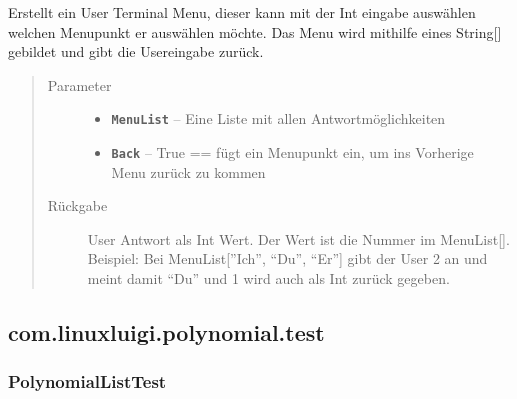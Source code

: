 \documentclass[letterpaper,10pt,ngerman]{sphinxmanual}
\begin{document}
\begin{fulllineitems}
\label{com/linuxluigi/polynomial/TerminalInterface:com.linuxluigi.polynomial.TerminalInterface.ShowMenu(String__, boolean)}
Erstellt ein User Terminal Menu, dieser kann mit der Int eingabe auswählen welchen Menupunkt er auswählen möchte. Das Menu wird mithilfe eines String{[}{]} gebildet und gibt die Usereingabe zurück.
\begin{quote}\begin{description}
\item[{Parameter}] \leavevmode\begin{itemize}
\item {} 
\textbf{\texttt{MenuList}} -- Eine Liste mit allen Antwortmöglichkeiten

\item {} 
\textbf{\texttt{Back}} -- True == fügt ein Menupunkt ein, um ins Vorherige Menu zurück zu kommen

\end{itemize}

\item[{Rückgabe}] \leavevmode
User Antwort als Int Wert. Der Wert ist die Nummer im MenuList{[}{]}. Beispiel: Bei MenuList{[}''Ich'', ``Du'', ``Er''{]} gibt der User 2 an und meint damit ``Du'' und 1 wird auch als Int zurück gegeben.

\end{description}\end{quote}

\end{fulllineitems}



\subsection{com.linuxluigi.polynomial.test}
\label{com/linuxluigi/polynomial/test/package-index:com-linuxluigi-polynomial-test}\label{com/linuxluigi/polynomial/test/package-index::doc}\label{com/linuxluigi/polynomial/test/package-index:package-com.linuxluigi.polynomial.test}

\subsubsection{PolynomialListTest}
\label{com/linuxluigi/polynomial/test/PolynomialListTest:polynomiallisttest}\label{com/linuxluigi/polynomial/test/PolynomialListTest::doc}
\end{document}

